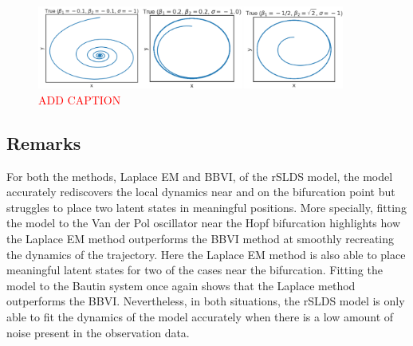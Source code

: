 \begin{figure}
    \centering
    \includegraphics[width=0.9\textwidth,height=\textwidth,keepaspectratio]{./Figures/bautin-true.png}
    \caption{\textcolor{red}{ADD CAPTION}}
    \label{fig}
\end{figure}

\subsection{Remarks}
For both the methods, Laplace EM and BBVI, of the rSLDS model, the model accurately rediscovers the local dynamics near and on the bifurcation point but struggles to place two latent states in meaningful positions. More specially, fitting the model to the Van der Pol oscillator near the Hopf bifurcation highlights how the Laplace EM method outperforms the BBVI method at smoothly recreating the dynamics of the trajectory. Here the Laplace EM method is also able to place meaningful latent states for two of the cases near the bifurcation. Fitting the model to the Bautin system once again shows that the Laplace method outperforms the BBVI. Nevertheless, in both situations, the rSLDS model is only able to fit the dynamics of the model accurately when there is a low amount of noise present in the observation data.

